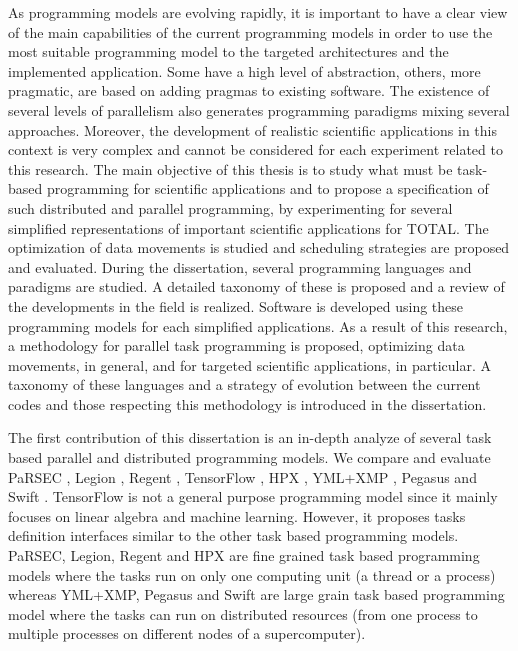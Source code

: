 As programming models are evolving rapidly, it is important to have a clear view of the main capabilities of the current programming models in order to use the most suitable programming model to the targeted architectures and the implemented application.
Some have a high level of abstraction, others, more pragmatic, are based on adding pragmas to existing software.
The existence of several levels of parallelism also generates programming paradigms mixing several approaches.
Moreover, the development of realistic scientific applications in this context is very complex and cannot be considered for each experiment related to this research.
The main objective of this thesis is to study what must be task-based programming for scientific applications and to propose a specification of such distributed and parallel programming, by experimenting for several simplified representations of important scientific applications for TOTAL.
The optimization of data movements is studied and scheduling strategies are proposed and evaluated.
During the dissertation, several programming languages and paradigms are studied.
A detailed taxonomy of these is proposed and a review of the developments in the field is realized.
Software is developed using these programming models for each simplified applications.
As a result of this research, a methodology for parallel task programming is proposed, optimizing data movements, in general, and for targeted scientific applications, in particular.
A taxonomy of these languages and a strategy of evolution between the current codes and those respecting this methodology is introduced in the dissertation.

The first contribution of this dissertation is an in-depth analyze of several task based parallel and distributed programming models.
We compare and evaluate PaRSEC \cite{BBDHL2011}, Legion \cite{BaTSA2012}, Regent \cite{SLTBA2015}, TensorFlow \cite{AABBC2016}, HPX \cite{KHASF2014}, YML+XMP \cite{DelaP2004}, Pegasus \cite{DSSBG2005} and Swift \cite{ZHCFL2007}.
TensorFlow is not a general purpose programming model since it mainly focuses on linear algebra and machine learning.
However, it proposes tasks definition interfaces similar to the other task based programming models.
PaRSEC, Legion, Regent and HPX are fine grained task based programming models where the tasks run on only one computing unit (a thread or a process) whereas YML+XMP, Pegasus and Swift are large grain task based programming model where the tasks can run on distributed resources (from one process to multiple processes on different nodes of a supercomputer).

